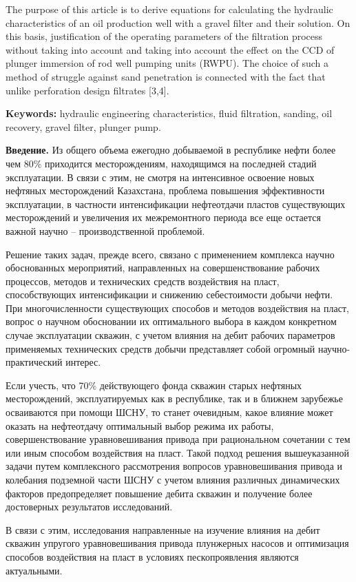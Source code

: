 The purpose of this article is to derive equations for calculating the
hydraulic characteristics of an oil production well with a gravel filter
and their solution. On this basis, justification of the operating
parameters of the filtration process without taking into account and
taking into account the effect on the CCD of plunger immersion of rod
well pumping units (RWPU). The choice of such a method of struggle
against sand penetration is connected with the fact that unlike
perforation design filtrates {[}3,4{]}.

{\bfseries Keywords:} hydraulic engineering characteristics, fluid
filtration, sanding, oil recovery, gravel filter, plunger pump.

{\bfseries Введение.} Из общего объема ежегодно добываемой в республике
нефти более чем 80\% приходится месторождениям, находящимся на последней
стадий эксплуатации. В связи с этим, не смотря на интенсивное освоение
новых нефтяных месторождений Казахстана, проблема повышения
эффективности эксплуатации, в частности интенсификации нефтеотдачи
пластов существующих месторождений и увеличения их межремонтного периода
все еще остается важной научно -- производственной проблемой.

Решение таких задач, прежде всего, связано с применением комплекса
научно обоснованных мероприятий, направленных на совершенствование
рабочих процессов, методов и технических средств воздействия на пласт,
способствующих интенсификации и снижению себестоимости добычи нефти. При
многочисленности существующих способов и методов воздействия на пласт,
вопрос о научном обосновании их оптимального выбора в каждом конкретном
случае эксплуатации скважин, с учетом влияния на дебит рабочих
параметров применяемых технических средств добычи представляет собой
огромный научно-практический интерес.

Если учесть, что 70\% действующего фонда скважин старых нефтяных
месторождений, эксплуатируемых как в республике, так и в ближнем
зарубежье осваиваются при помощи ШСНУ, то станет очевидным, какое
влияние может оказать на нефтеотдачу оптимальный выбор режима их работы,
совершенствование уравновешивания привода при рациональном сочетании с
тем или иным способом воздействия на пласт. Такой подход решения
вышеуказанной задачи путем комплексного рассмотрения вопросов
уравновешивания привода и колебания подземной части ШСНУ с учетом
влияния различных динамических факторов предопределяет повышение дебита
скважин и получение более достоверных результатов исследований.

В связи с этим, исследования направленные на изучение влияния на дебит
скважин упругого уравновешивания привода плунжерных насосов и
оптимизация способов воздействия на пласт в условиях пескопроявления
являются актуальными.

